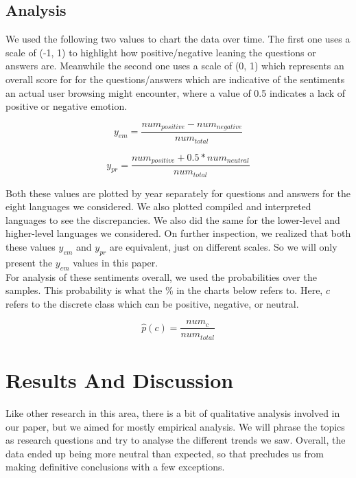 \documentclass[conference]{IEEEtran}
\begin{document}
\subsection{Analysis}

We used the following two values to chart the data over time. The first one uses a scale of (-1, 1) to highlight how positive/negative leaning the questions or answers are. Meanwhile the second one uses a scale of (0, 1) which represents an overall score for for the questions/answers which are indicative of the sentiments an actual user browsing might encounter, where a value of 0.5 indicates a lack of positive or negative emotion.

\begin{equation}
    y_{em} = \frac{num_{positive} - num_{negative}}{num_{total}}
\end{equation}

\begin{equation}
    y_{pr} = \frac{num_{positive} + 0.5*num_{neutral}}{num_{total}}
\end{equation}

Both these values are plotted by year separately for questions and answers for the eight languages we considered. We also plotted compiled and interpreted languages to see the discrepancies. We also did the same for the lower-level and higher-level languages we considered. On further inspection, we realized that both these values $y_{em}$ and $y_{pr}$ are equivalent, just on different scales. So we will only present the $y_{em}$ values in this paper. \\

For analysis of these sentiments overall, we used the probabilities over the samples. This probability is what the \% in the charts below refers to. Here, $c$ refers to the discrete class which can be positive, negative, or neutral.

\begin{equation}
    \hat{p}(c) = \frac{num_c}{num_{total}}
\end{equation}

\vspace{8pt}
\section{Results And Discussion}
Like other research in this area, there is a bit of qualitative analysis involved in our paper, but we aimed for mostly empirical analysis. We will phrase the topics as research questions and try to analyse the different trends we saw. Overall, the data ended up being more neutral than expected, so that precludes us from making definitive conclusions with a few exceptions. \\
\end{document}
